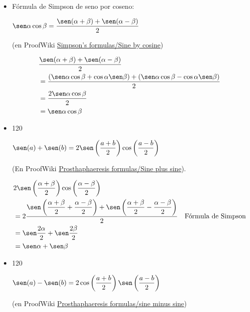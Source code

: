 \documentclass[11pt]{article}
\begin{document}
\begin{itemize}
\item Fórmula de Simpson de seno por coseno: \\
\begin{teorema}
\(\sen \alpha \cos \beta = \dfrac{\sen(\alpha+\beta) + \sen(\alpha-\beta)}{2}\)
\end{teorema}
\begin{demostracion}
(en ProofWiki \href{https://proofwiki.org/wiki/Simpson\%27s\_Formulas/Sine\_by\_Cosine}{Simpson's formulas/Sine by cosine})

\begin{align*}
 &  \dfrac{\sen(\alpha+\beta) + \sen(\alpha-\beta)}{2} \\
 &= \dfrac{(\sen \alpha \cos \beta + \cos \alpha \sen \beta) + (\sen \alpha \cos \beta - \cos \alpha \sen \beta)}{2} \\
 &= \dfrac{2 \sen \alpha \cos \beta}{2} \\
 &= \sen \alpha \cos \beta
\end{align*}
\end{demostracion}

\item 120
\begin{teorema}
\(\sen(a) + \sen(b) =
  2\sen\left(\dfrac{a+b}{2}\right)\cos\left(\dfrac{a-b}{2}\right)\)
\end{teorema}
\begin{demostracion}
(En ProofWiki \href{https://proofwiki.org/wiki/Prosthaphaeresis\_Formulas/Sine\_plus\_Sine}{Prosthaphaeresis formulas/Sine plus sine}).

\begin{align*}
  &  2 \sen\left(\dfrac{\alpha+\beta}{2}\right)
       \cos\left(\dfrac{\alpha-\beta}{2}\right) \\
  &= 2 \dfrac{\sen\left(\dfrac{\alpha+\beta}{2} + \dfrac{\alpha-\beta}{2}\right) +
              \sen\left(\dfrac{\alpha+\beta}{2} - \dfrac{\alpha-\beta}{2}\right)}
             {2}
       & \mbox{Fórmula de Simpson} \\
  &= \sen \frac{2\alpha}{2} + \sen \frac{2\beta}{2} \\
  &= \sen \alpha + \sen \beta \\
\end{align*}
\end{demostracion}

\item 120
\begin{teorema}
\(\sen(a) - \sen(b) =
  2\cos\left(\dfrac{a+b}{2}\right)\sen\left(\dfrac{a-b}{2}\right)\)
\end{teorema}
\begin{demostracion}
(en ProofWiki \href{https://proofwiki.org/wiki/Prosthaphaeresis\_Formulas/Sine\_minus\_Sine}{Prosthaphaeresis formulas/sine minus sine})


\end{demostracion}
\end{itemize}
\end{document}
